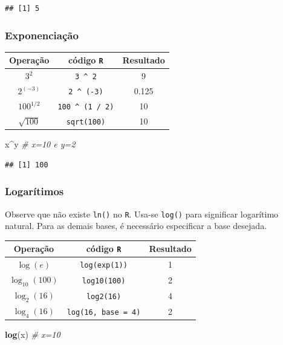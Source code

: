 \documentclass[
]{book}
\newenvironment{Shaded}{\begin{snugshade}}{\end{snugshade}}
\newcommand{\CommentTok}[1]{\textcolor[rgb]{0.56,0.35,0.01}{\textit{#1}}}
\newcommand{\KeywordTok}[1]{\textcolor[rgb]{0.13,0.29,0.53}{\textbf{#1}}}
\newcommand{\NormalTok}[1]{#1}
\newcommand{\OperatorTok}[1]{\textcolor[rgb]{0.81,0.36,0.00}{\textbf{#1}}}
\theoremstyle{definition}
\theoremstyle{definition}
\theoremstyle{definition}
\theoremstyle{remark}
\begin{document}
\begin{verbatim}
## [1] 5
\end{verbatim}

\hypertarget{exponenciauxe7uxe3o}{%
\subsubsection{Exponenciação}\label{exponenciauxe7uxe3o}}

\begin{longtable}[]{@{}ccc@{}}
\toprule
Operação & código \texttt{R} & Resultado\tabularnewline
\midrule
\endhead
\(3^2\) & \texttt{3\ \^{}\ 2} & 9\tabularnewline
\(2^{(-3)}\) & \texttt{2\ \^{}\ (-3)} & 0.125\tabularnewline
\(100^{1/2}\) & \texttt{100\ \^{}\ (1\ /\ 2)} & 10\tabularnewline
\(\sqrt{100}\) & \texttt{sqrt(100)} & 10\tabularnewline
\bottomrule
\end{longtable}

\begin{Shaded}
\begin{Highlighting}[]
\NormalTok{x}\OperatorTok{^}\NormalTok{y         }\CommentTok{# x=10 e y=2}
\end{Highlighting}
\end{Shaded}

\begin{verbatim}
## [1] 100
\end{verbatim}

\hypertarget{logaruxedtimos}{%
\subsubsection{Logarítimos}\label{logaruxedtimos}}

Observe que não existe \texttt{ln()} no \texttt{R}. Usa-se \texttt{log()} para significar logarítimo natural. Para as demais bases, é necessário especificar a base desejada.

\begin{longtable}[]{@{}ccc@{}}
\toprule
Operação & código \texttt{R} & Resultado\tabularnewline
\midrule
\endhead
\(\log(e)\) & \texttt{log(exp(1))} & 1\tabularnewline
\(\log_{10}(100)\) & \texttt{log10(100)} & 2\tabularnewline
\(\log_{2}(16)\) & \texttt{log2(16)} & 4\tabularnewline
\(\log_{4}(16)\) & \texttt{log(16,\ base\ =\ 4)} & 2\tabularnewline
\bottomrule
\end{longtable}

\begin{Shaded}
\begin{Highlighting}[]
\KeywordTok{log}\NormalTok{(x)        }\CommentTok{# x=10}
\end{Highlighting}
\end{Shaded}
\end{document}
